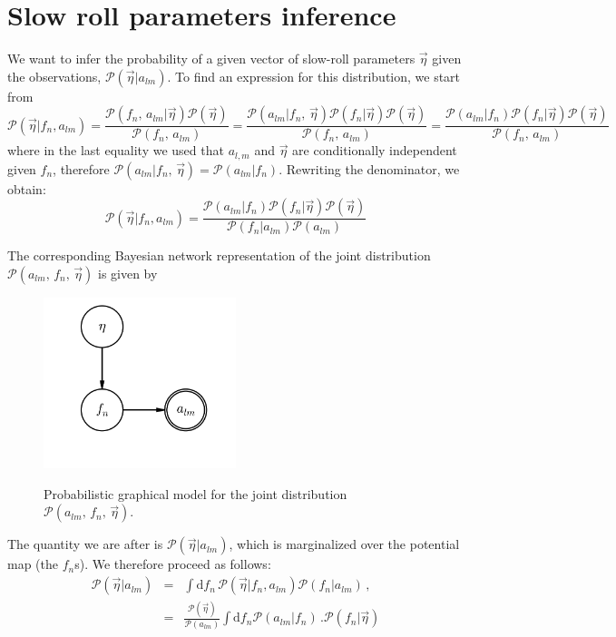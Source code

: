 \documentclass[prd, onecolumn, floatfix, letterpaper, nofootinbib, amsmath, amssymb, superscriptaddress]{revtex4}
\renewcommand{\(}{\left(}
\renewcommand{\)}{\right)}
\renewcommand{\[}{\left[}
\renewcommand{\]}{\right]}
\def\be{\begin{equation}}
\def\ee{\end{equation}}
\def\bea{\begin{eqnarray}}
\def\eea{\end{eqnarray}}
\begin{document}
 \section{Slow roll parameters inference}
 
 We want to infer the probability of a given vector of slow-roll parameters $\vec{\eta}$ given the observations, $\mathcal{P}(\vec{\eta}| a_{lm})$. To find an expression for this distribution, we start from 
 \be
 	\mathcal{P}(\vec{\eta}| f_n, a_{lm})=\frac{\mathcal{P}( f_n, \, a_{lm}|\vec{\eta})\mathcal{P}(\vec{\eta})}{\mathcal{P}( f_n,\, a_{lm})}=\frac{\mathcal{P}( a_{lm}| f_n,\,\vec{\eta}) \mathcal{P}( f_n|\vec{\eta})\mathcal{P}(\vec{\eta})}{\mathcal{P}( f_n, \, a_{lm})} = \frac{\mathcal{P}( a_{lm}| f_n) \mathcal{P}( f_n|\vec{\eta})\mathcal{P}(\vec{\eta})}{\mathcal{P}( f_n, \, a_{lm})}
 \ee
where in the last equality we used that $a_{l,m}$ and $\vec{\eta}$ are conditionally independent given $f_n$, therefore $\mathcal{P}( a_{lm}| f_n, \,\vec{\eta})= \mathcal{P}( a_{lm}| f_n)$. Rewriting the denominator, we obtain:
\be
	\mathcal{P}(\vec{\eta}| f_n, a_{lm})=\frac{\mathcal{P}( a_{lm}| f_n) \mathcal{P}( f_n|\vec{\eta})\mathcal{P}(\vec{\eta})}{\mathcal{P}( f_n|a_{lm} )\mathcal{P}(a_{lm})}
\ee

The corresponding Bayesian network representation of the joint distribution $\mathcal{P}(a_{lm},\,f_n,\,\vec{\eta} )$ is given by

\begin{figure}[h]
\begin{center}
\centering
\includegraphics[width=0.50\textwidth]{pgm/inflation.png}\\
\caption{\label{inflationPGM} Probabilistic graphical model for the joint distribution $\mathcal{P}(a_{lm},\,f_n,\,\vec{\eta} )$.
}

\end{center}
\end{figure}

The quantity we are after is $\mathcal{P}(\vec{\eta}| a_{lm})$, which is marginalized over the potential map (the $f_n$s). We therefore proceed as follows:
 \bea
 	\mathcal{P}(\vec{\eta}| a_{lm} )&=& \int \mathrm{d}f_n\, \mathcal{P}(\vec{\eta}| f_n, a_{lm}) \mathcal{P}(f_n | a_{lm}) \, ,
	\\
	&=&\frac{\mathcal{P}(\vec{\eta})}{\mathcal{P}(a_{lm})}\int \mathrm{d}f_n\mathcal{P}( a_{lm}| f_n) \, .\mathcal{P}( f_n|\vec{\eta})
 \eea
\end{document}
